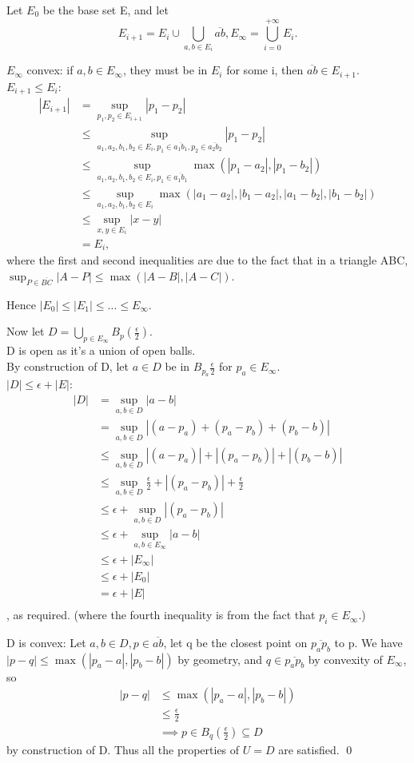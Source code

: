 Let $E_0$ be the base set E, and let 
$$E_{i+1} = E_i \cup \bigcup_{a, b \in E_i} \overline{ab}, E_\infty = \bigcup_{i=0}^{+\infty} E_i.$$

$E_\infty$ convex: if $a, b \in E_\infty$, they must be in $E_i$ for some i, then $\overline{ab} \in E_{i+1}$. \\
$E_{i+1} \leq E_i$: 
\begin{align*}
|E_{i+1}| 
&= \sup_{p_1, p_2 \in E_{i+1}} |p_1-p_2| \\
&\leq \sup_{a_1, a_2, b_1, b_2 \in E_i, p_1 \in \overline{a_1b_1}, p_2 \in \overline{a_2b_2}} |p_1-p_2| \\
&\leq \sup_{a_1, a_2, b_1, b_2 \in E_i, p_1 \in \overline{a_1b_1} } \max(|p_1-a_2|, |p_1-b_2|) \\
&\leq \sup_{a_1, a_2, b_1, b_2 \in E_i} \max(|a_1-a_2|, |b_1-a_2|, |a_1-b_2|, |b_1-b_2|) \\
&\leq \sup_{x, y \in E_i} |x-y| \\
&= E_i,
\end{align*}
where the first and second inequalities are due to the fact that in a triangle ABC, $\sup_{P \in \overline{BC}} |A-P| \leq \max(|A-B|, |A-C|)$.

Hence $|E_0| \leq |E_1| \leq \ldots \leq E_\infty$.

Now let $D = \bigcup_{p \in E_{\infty}} B_p(\frac{\epsilon}{2})$.\\
D is open as it's a union of open balls. \\
By construction of D, let $a \in D$ be in $B_{p_a}\frac{\epsilon}{2}$ for $p_a \in E_\infty$. \\
$|D| \leq \epsilon + |E|$:
\begin{align*}
|D|
&= \sup_{a,b \in D} |a-b|\\
&= \sup_{a,b \in D} |(a-p_a) + (p_a-p_b) + (p_b-b)|\\
&\leq \sup_{a,b \in D} |(a-p_a)| + |(p_a-p_b)| + |(p_b-b)|\\
&\leq \sup_{a,b \in D} \frac{\epsilon}{2} + |(p_a-p_b)| + \frac{\epsilon}{2}\\
&\leq \epsilon + \sup_{a,b \in D} |(p_a-p_b)| \\
&\leq \epsilon + \sup_{a,b \in E_\infty} |a-b| \\
&\leq  \epsilon + |E_\infty| \\
&\leq  \epsilon + |E_0| \\
&=  \epsilon + |E| \\
\end{align*}, as required. (where the fourth inequality is from the fact that $p_i \in E_{\infty}$.)

D is convex: Let $a, b \in D, p \in \overline{ab}$, let q be the closest point on $\overline{p_ap_b}$ to p. We have $|p-q| \leq \max(|p_a - a|, |p_b - b|)$ by geometry, and $q \in \overline{p_ap_b}$ by convexity of $E_\infty$, so
\begin{align*}
|p-q| 
&\leq \max(|p_a - a|, |p_b - b|) \\
&\leq \frac{\epsilon}{2} \\
&\implies p \in B_q(\frac{\epsilon}{2}) \subseteq D
\end{align*} by construction of D. 
Thus all the properties of $U = D$ are satisfied. \qed




